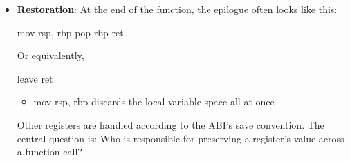 \documentclass{report}
\begin{document}
\begin{itemize}
\begin{cppcode}
                sub rsb,32
                \end{cppcode}
                \begin{itemize}
                    \item push rbp saves the caller’s frame pointer
                    \item mov rbp, rsp makes rbp point to the base of the new frame
                    \item sub rsp, 32 reserves 32 bytes for local storage
                \end{itemize}
                So the usual mental model is:
                \begin{itemize}
                    \item rbp = stable anchor for this frame
                    \item rsp = moving top of stack
                \end{itemize}
                The stack might look like this 
                \bigbreak \noindent 
                \begin{cppcode}
                    higher addresses
                    -------------------------
                    arguments passed on stack
                    return address
                    saved old rbp      <- rbp
                    local variable 1
                    local variable 2
                    temporary space
                    -------------------------
                    lower addresses    <- rsp
                \end{cppcode}
            \item \textbf{Restoration}: At the end of the function, the epilogue often looks like this:
                \bigbreak \noindent 
                \begin{cppcode}
                mov rsp, rbp
                pop rbp
                ret
                \end{cppcode}
                \bigbreak \noindent 
                Or equivalently,
                \bigbreak \noindent 
                \begin{cppcode}
                leave
                ret
                \end{cppcode}
                \bigbreak \noindent 
                \begin{itemize}
                    \item mov rsp, rbp discards the local variable space all at once
                \end{itemize}
                Other registers are handled according to the ABI’s save convention. The central question is: Who is responsible for preserving a register’s value across a function call?

\end{itemize}
\end{document}
